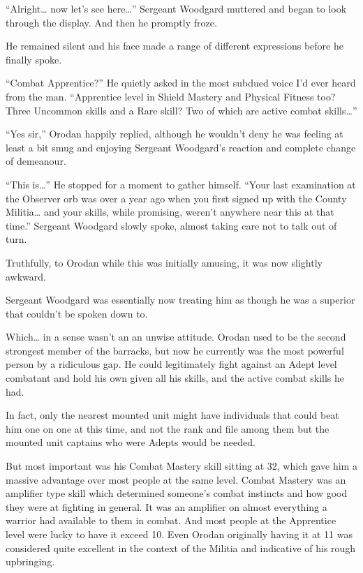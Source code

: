 \documentclass[a4paper,10pt]{book}
\begin{document}
“Alright… now let’s see here…” Sergeant Woodgard muttered and began to look through the display. And then he promptly froze.\par
He remained silent and his face made a range of different expressions before he finally spoke.\par
“Combat Apprentice?” He quietly asked in the most subdued voice I’d ever heard from the man. “Apprentice level in Shield Mastery and Physical Fitness too? Three Uncommon skills and a Rare skill? Two of which are active combat skills…”\par
“Yes sir,” Orodan happily replied, although he wouldn’t deny he was feeling at least a bit smug and enjoying Sergeant Woodgard’s reaction and complete change of demeanour.\par
“This is…” He stopped for a moment to gather himself. “Your last examination at the Observer orb was over a year ago when you first signed up with the County Militia… and your skills, while promising, weren’t anywhere near this at that time.” Sergeant Woodgard slowly spoke, almost taking care not to talk out of turn.\par
Truthfully, to Orodan while this was initially amusing, it was now slightly awkward.\par
Sergeant Woodgard was essentially now treating him as though he was a superior that couldn’t be spoken down to.\par
Which… in a sense wasn’t an an unwise attitude. Orodan used to be the second strongest member of the barracks, but now he currently was the most powerful person by a ridiculous gap. He could legitimately fight against an Adept level combatant and hold his own given all his skills, and the active combat skills he had.\par
In fact, only the nearest mounted unit might have individuals that could beat him one on one at this time, and not the rank and file among them but the mounted unit captains who were Adepts would be needed.\par
But most important was his Combat Mastery skill sitting at 32, which gave him a massive advantage over most people at the same level. Combat Mastery was an amplifier type skill which determined someone’s combat instincts and how good they were at fighting in general. It was an amplifier on almost everything a warrior had available to them in combat. And most people at the Apprentice level were lucky to have it exceed 10. Even Orodan originally having it at 11 was considered quite excellent in the context of the Militia and indicative of his rough upbringing.\par
\end{document}
